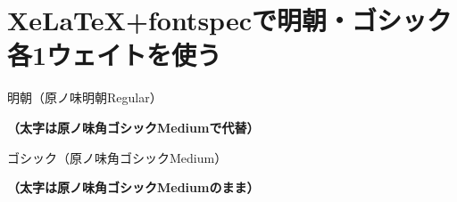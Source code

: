 \documentclass[xelatex,ja=standard]{bxjsarticle}
\begin{document}
\section{Xe\LaTeX +fontspecで明朝・ゴシック各1ウェイトを使う}

\rmfamily
\mcfamily
\mdseries
明朝（原ノ味明朝Regular）

\bfseries
（太字は原ノ味角ゴシックMediumで代替）

\sffamily
\gtfamily
\mdseries
ゴシック（原ノ味角ゴシックMedium）

\bfseries
（太字は原ノ味角ゴシックMediumのまま）
\end{document}
